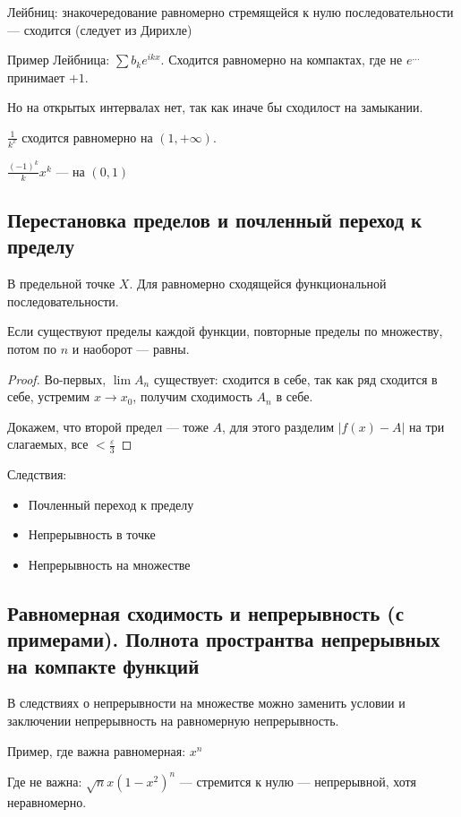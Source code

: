 \documentclass[12pt, a4paper, oneside]{memoir}
\begin{document}
Лейбниц: знакочередование равномерно стремящейся к нулю последовательности — сходится (следует из Дирихле)

Пример Лейбница: $\sum b_k e^{ikx}$.
Сходится равномерно на компактах, где не $e^{…}$ принимает $+1$.

Но на открытых интервалах нет, так как иначе бы сходилост на замыкании.

$\frac{1}{k^x}$ сходится равномерно на $(1, +\infty)$.

$\frac{(-1)^k}{k}x^k$ — на $(0, 1)$

\subsection{Перестановка пределов и почленный переход к пределу}

В предельной точке $X$. Для равномерно сходящейся функциональной последовательности.

 
Если существуют пределы каждой функции, повторные пределы по множеству, потом по $n$ и наоборот — равны.

\begin{proof}
    Во-первых, $\lim A_n$ существует: сходится в себе, так как ряд сходится в себе, устремим $x → x_0$, получим сходимость $A_n$ в себе.

    Докажем, что второй предел — тоже $A$, для этого разделим $|f(x) - A|$ на три слагаемых, все $< \frac{\varepsilon}{3}$
\end{proof}

Следствия: 
\begin{itemize}
    \item Почленный переход к пределу
    \item Непрерывность в точке
    \item Непрерывность на множестве
\end{itemize}


\subsection{Равномерная сходимость и непрерывность (с примерами).
Полнота пространтва непрерывных на компакте функций}

В следствиях о непрерывности на множестве можно заменить 
условии и заключении непрерывность на равномерную непрерывность.

Пример, где важна равномерная: $x^n$

Где не важна: $\sqrt{n} x (1 - x^2)^n$ — стремится к нулю — непрерывной, хотя неравномерно.
\end{document}
